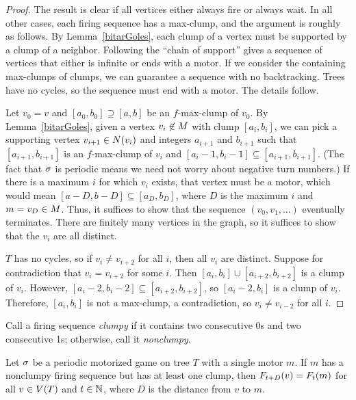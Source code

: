 \begin{proof}
The result is clear if all vertices either always fire or always wait. In all
other cases, each firing sequence has a max-clump, and the argument is roughly
as follows. By Lemma~\ref{bitarGoles}, each clump of a vertex must be supported
by a clump of a neighbor.  Following the ``chain of support'' gives a sequence
of vertices that either is infinite or ends with a motor. If we consider the
containing max-clumps of clumps, we can guarantee a sequence with no
backtracking. Trees have no cycles, so the sequence must end with a motor. The
details follow.

Let $v_0 = v$ and $[a_0, b_0] \supseteq [a, b]$ be an $f$-max-clump of
$v_0$. By Lemma~\ref{bitarGoles}, given a vertex $v_i \not\in \mots$ with clump
$[a_i, b_i]$, we can pick a supporting vertex $v_{i+1} \in \N{v_i}$ and
integers $a_{i+1}$ and $b_{i+1}$ such that $[a_{i+1}, b_{i+1}]$ is an
$f$-max-clump of $v_i$ and $[a_i - 1, b_i - 1] \subseteq [a_{i+1},
b_{i+1}]$. (The fact that $\s$ is periodic means we need not worry about
negative turn numbers.) If there is a maximum $i$ for which $v_i$ exists, that
vertex must be a motor, which would mean $[a-D, b-D] \subseteq [a_D, b_D]$,
where $D$ is the maximum $i$ and $m = v_D \in \mots$. Thus, it suffices to show
that the sequence $(v_0, v_1, \ldots)$ eventually terminates. There are
finitely many vertices in the graph, so it suffices to show that the $v_i$ are
all distinct.

$T$ has no cycles, so if $v_i \neq v_{i+2}$ for all $i$, then all $v_i$ are
distinct. Suppose for contradiction that $v_i = v_{i+2}$ for some $i$. Then
$[a_i, b_i] \cup [a_{i+2}, b_{i+2}]$ is a clump of $v_i$. However, $[a_i - 2,
b_i - 2] \subseteq [a_{i+2}, b_{i+2}]$, so $[a_i - 2, b_i]$ is a clump of
$v_i$. Therefore, $[a_i, b_i]$ is not a max-clump, a contradiction, so $v_i
\neq v_{i-2}$ for all $i$.
\end{proof}

Call a firing sequence \emph{clumpy} if it contains two consecutive 0s and two
consecutive 1s; otherwise, call it \emph{nonclumpy}.

\begin{cor} \label{freeLunch}
Let $\s$ be a periodic motorized game on tree $T$ with a single motor $m$. If
$m$ has a nonclumpy firing sequence but has at least one clump, then
$\firing{v}{t+D} = \firing{m}{t}$ for all $v \in \V[T]$ and $t \in \nats$,
where $D$ is the distance from $v$ to $m$.
\end{cor}

